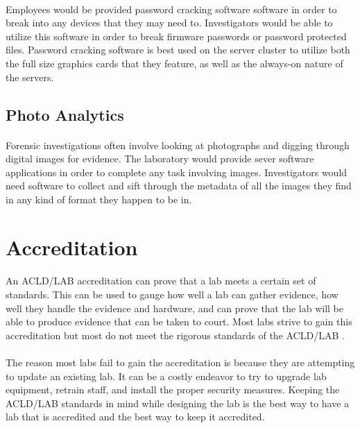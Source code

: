 \documentclass[12pt]{article}
\begin{document}
\paragraph{}
Employees would be provided password cracking software software in order to break into any devices that they may need to.
Investigators would be able to utilize this software in order to break firmware passwords or password protected files.
Password cracking software is best used on the server cluster to utilize both the full size graphics cards that they feature, as well as the always-on nature of the servers. 
\cite[p.~138]{hayes}
\subsection{Photo Analytics}
\paragraph{}
Forensic investigations often involve looking at photographs and digging through digital images for evidence. 
The laboratory would provide sever software applications in order to complete any task involving images.
Investigators would need software to collect and sift through the metadata of all the images they find in any kind of format they happen to be in.  


\section{Accreditation}
\paragraph{} 
An ACLD/LAB accreditation can prove that a lab meets a certain set of standards.
This can be used to gauge how well a lab can gather evidence, how well they handle the evidence and hardware, and can prove that the lab will be able to produce evidence that can be taken to court.
Most labs strive to gain this accreditation but most do not meet the rigorous standards of the ACLD/LAB \cite{hayes}.
\paragraph{}
The reason most labs fail to gain the accreditation is because they are attempting to update an existing lab.
It can be a costly endeavor to try to upgrade lab equipment, retrain staff, and install the proper security measures.
Keeping the ACLD/LAB standards in mind while designing the lab is the best way to have a lab that is accredited and the best way to keep it accredited.
\end{document}
